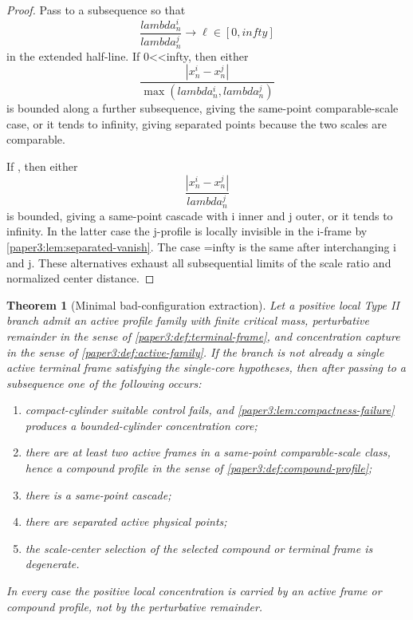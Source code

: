 \documentclass[11pt]{amsart}
\def\({}%
\def\){}%
\def\lambda{lambda}%
\def\infty{infty}%
\theoremstyle{plain}
\newtheorem{theorem}{Theorem}[section]
\theoremstyle{definition}
\theoremstyle{remark}
\begin{document}
\begin{proof}
Pass to a subsequence so that
\[
  \frac{\lambda^i_n}{\lambda^j_n}\to \ell\in[0,\infty]
\]
in the extended half-line.  If \(0<\ell<\infty\), then either
\[
  \frac{|x^i_n-x^j_n|}{\max(\lambda^i_n,\lambda^j_n)}
\]
is bounded along a further subsequence, giving the same-point comparable-scale
case, or it tends to infinity, giving separated points because the two scales
are comparable.
\par
If \(\), then either
\[
  \frac{|x^i_n-x^j_n|}{\lambda^j_n}
\]
is bounded, giving a same-point cascade with \(i\) inner and \(j\) outer, or it
tends to infinity.  In the latter case the \(j\)-profile is locally invisible in
the \(i\)-frame by \cref{paper3:lem:separated-vanish}.  The case \(\ell=\infty\) is the
same after interchanging \(i\) and \(j\).  These alternatives exhaust all
subsequential limits of the scale ratio and normalized center distance.
\end{proof}

\begin{theorem}[Minimal bad-configuration extraction]\label{paper3:thm:minimal-bad-extraction}
Let a positive local Type II branch admit an active profile family with finite
critical mass, perturbative remainder in the sense of
\cref{paper3:def:terminal-frame}, and concentration capture in the sense of
\cref{paper3:def:active-family}.  If the branch is not already a single active
terminal frame satisfying the single-core hypotheses, then after passing to a
subsequence one of the following occurs:
\begin{enumerate}[label=\textup{(\roman*)}]
\item compact-cylinder suitable control fails, and
\cref{paper3:lem:compactness-failure} produces a bounded-cylinder concentration core;
\item there are at least two active frames in a same-point comparable-scale
class, hence a compound profile in the sense of \cref{paper3:def:compound-profile};
\item there is a same-point cascade;
\item there are separated active physical points;
\item the scale-center selection of the selected compound or terminal frame is
degenerate.
\end{enumerate}
In every case the positive local concentration is carried by an active frame or
compound profile, not by the perturbative remainder.
\end{theorem}
\end{document}
